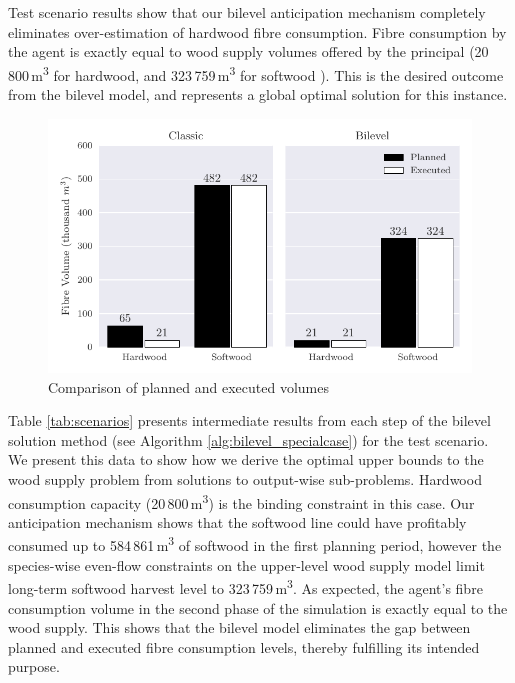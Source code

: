 
Test scenario results show that our bilevel anticipation mechanism completely eliminates over-estimation of hardwood fibre consumption. 
Fibre consumption by the agent is exactly equal to wood supply volumes offered by the principal (20\,800\,\si{\cubic\metre} for hardwood, and 323\,759\,\si{\cubic\metre} for softwood ).
This is the desired outcome from the bilevel model, and represents a global optimal solution for this instance.

\begin{figure}[Ht!]
  \centering
  \medskip
  \includegraphics[width=\textwidth]{images/article2_compbar}
  \caption{Comparison of planned and executed volumes}
  \label{fig:scenarios}
\end{figure}

Table \ref{tab:scenarios} presents intermediate results from each step of the bilevel solution method (see Algorithm \ref{alg:bilevel_specialcase}) for the test scenario.
We present this data to show how we derive the optimal upper bounds to the wood supply problem from solutions to output-wise sub-problems.
Hardwood consumption capacity (20\,800\,\si{\cubic\metre}) is the binding constraint in this case. 
Our anticipation mechanism shows that the softwood line could have profitably consumed up to 584\,861\,\si{\cubic\metre} of softwood in the first planning period, however the species-wise even-flow constraints on the upper-level wood supply model limit long-term softwood harvest level to 323\,759\,\si{\cubic\metre}.
As expected, the agent's fibre consumption volume in the second phase of the simulation is exactly equal to the wood supply.
This shows that the bilevel model eliminates the gap between planned and executed fibre consumption levels, thereby fulfilling its intended purpose.

